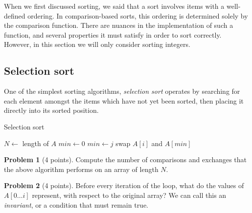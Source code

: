 \documentclass{exam}
\theoremstyle{definition}
\newtheorem{problem}{Problem}[section]
\theoremstyle{definition}
\begin{document}
When we first discussed sorting, we said that a sort involves items with a well-defined ordering. In comparison-based sorts, this ordering is determined solely by the comparison function. There are nuances in the implementation of such a function, and several properties it must satisfy in order to sort correctly. However, in this section we will only consider sorting integers.


\subsection{Selection sort}

One of the simplest sorting algorithms, \textit{selection sort} operates by searching for each element amongst the items which have not yet been sorted, then placing it directly into its sorted position.

\begin{algorithm}[H]
\caption{Selection sort}
\begin{algorithmic}
    \State $N \gets $ length of $A$
        \State $min \gets 0$
                \State $min \gets j$
            \EndIf
        \EndFor
        \State swap $ A[i] $ and $ A[min] $
    \EndFor
\EndFunction
\end{algorithmic}
\end{algorithm}


\begin{problem}[4 points]
    Compute the number of comparisons and exchanges that the above algorithm performs on an array of length $ N $.
\end{problem}

\begin{problem}[4 points]
    Before every iteration of the loop, what do the values of $A[0 \dots i]$ represent, with respect to the original array? We can call this an \textit{invariant}, or a condition that must remain true.
\end{problem}
\end{document}
